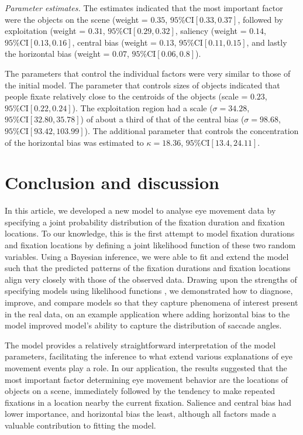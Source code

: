 \documentclass{article}
\begin{document}
\textit{Parameter estimates.} The estimates indicated that the most important factor were the objects on the scene (weight = $0.35$, $95\%\text{CI}[0.33, 0.37]$, followed by exploitation (weight = $0.31$, $95\%\text{CI}[0.29, 0.32]$, saliency (weight = $0.14$, $95\%\text{CI}[0.13, 0.16]$, central bias (weight = $0.13$, $95\%\text{CI}[0.11, 0.15]$, and lastly the horizontal bias (weight = $0.07$, $95\%\text{CI}[0.06, 0.8]$).

The parameters that control the individual factors were very similar to those of the initial model. The parameter that controls sizes of objects indicated that people fixate relatively close to the centroids of the objects (scale = $0.23$, $95\%\text{CI}[0.22, 0.24]$). The exploitation region had a scale ($\sigma = 34.28$, $95\%\text{CI}[32.80, 35.78]$) of about a third of that of the central bias ($\sigma=98.68$, $95\%\text{CI}[93.42, 103.99]$). The additional parameter that controls the concentration of the horizontal bias was estimated to $\kappa = 18.36$, $95\%\text{CI}[13.4,24.11]$.


\section{Conclusion and discussion}

In this article, we developed a new model to analyse eye movement data by specifying a joint probability distribution of the fixation duration and fixation locations. To our knowledge, this is the first attempt to model fixation durations and fixation locations by defining a joint likelihood function of these two random variables. Using a Bayesian inference, we were able to fit and extend the model such that the predicted patterns of the fixation durations and fixation locations align very closely with those of the observed data. Drawing upon the strengths of specifying models using likelihood functions \citep{schutt2017likelihood}, we demonstrated how to diagnose, improve, and compare models so that they capture phenomena of interest present in the real data, on an example application where adding horizontal bias to the model improved model's ability to capture the distribution of saccade angles.

The model provides a relatively straightforward interpretation of the model parameters, facilitating the inference to what extend various explanations of eye movement events play a role. In our application, the results suggested that the most important factor determining eye movement behavior are the locations of objects on a scene, immediately followed by the tendency to make repeated fixations in a location nearby the current fixation. Salience and central bias had lower importance, and horizontal bias the least, although all factors made a valuable contribution to fitting the model.
\end{document}
